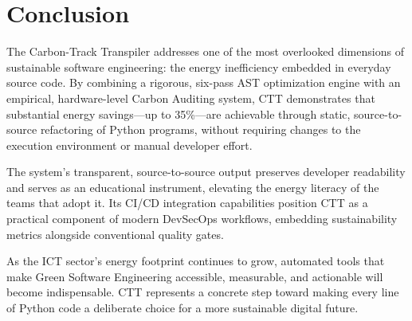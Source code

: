 \documentclass[conference]{IEEEtran}
\begin{document}
\section{Conclusion}

The Carbon-Track Transpiler addresses one of the most overlooked dimensions
of sustainable software engineering: the energy inefficiency embedded in
everyday source code.  By combining a rigorous, six-pass AST optimization
engine with an empirical, hardware-level Carbon Auditing system, CTT
demonstrates that substantial energy savings---up to 35\%---are achievable
through static, source-to-source refactoring of Python programs, without
requiring changes to the execution environment or manual developer effort.

The system's transparent, source-to-source output preserves developer
readability and serves as an educational instrument, elevating the energy
literacy of the teams that adopt it.  Its CI/CD integration capabilities
position CTT as a practical component of modern DevSecOps workflows, embedding
sustainability metrics alongside conventional quality gates.

As the ICT sector's energy footprint continues to grow, automated tools that
make Green Software Engineering accessible, measurable, and actionable will
become indispensable.  CTT represents a concrete step toward making every line
of Python code a deliberate choice for a more sustainable digital future.
\end{document}
